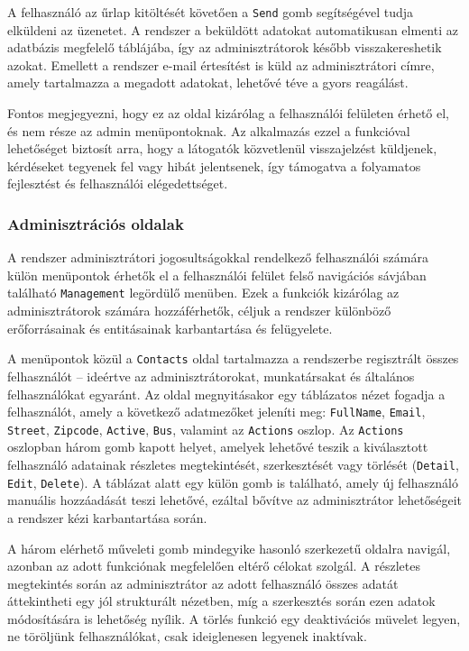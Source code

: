A felhasználó az űrlap kitöltését követően a \texttt{Send} gomb segítségével tudja elküldeni az üzenetet. A rendszer a beküldött adatokat automatikusan elmenti az adatbázis megfelelő táblájába, így az adminisztrátorok később visszakereshetik azokat. Emellett a rendszer e-mail értesítést is küld az adminisztrátori címre, amely tartalmazza a megadott adatokat, lehetővé téve a gyors reagálást.

Fontos megjegyezni, hogy ez az oldal kizárólag a felhasználói felületen érhető el, és nem része az admin menüpontoknak. Az alkalmazás ezzel a funkcióval lehetőséget biztosít arra, hogy a látogatók közvetlenül visszajelzést küldjenek, kérdéseket tegyenek fel vagy hibát jelentsenek, így támogatva a folyamatos fejlesztést és felhasználói elégedettséget.

\subsubsection{Adminisztrációs oldalak}

A rendszer adminisztrátori jogosultságokkal rendelkező felhasználói számára külön menüpontok érhetők el a felhasználói felület felső navigációs sávjában található \texttt{Management} legördülő menüben. Ezek a funkciók kizárólag az adminisztrátorok számára hozzáférhetők, céljuk a rendszer különböző erőforrásainak és entitásainak karbantartása és felügyelete.

A menüpontok közül a \texttt{Contacts} oldal tartalmazza a rendszerbe regisztrált összes felhasználót – ideértve az adminisztrátorokat, munkatársakat és általános felhasználókat egyaránt. Az oldal megnyitásakor egy táblázatos nézet fogadja a felhasználót, amely a következő adatmezőket jeleníti meg: \texttt{FullName}, \texttt{Email}, \texttt{Street}, \texttt{Zipcode}, \texttt{Active}, \texttt{Bus}, valamint az \texttt{Actions} oszlop. Az \texttt{Actions} oszlopban három gomb kapott helyet, amelyek lehetővé teszik a kiválasztott felhasználó adatainak részletes megtekintését, szerkesztését vagy törlését (\texttt{Detail}, \texttt{Edit}, \texttt{Delete}). A táblázat alatt egy külön gomb is található, amely új felhasználó manuális hozzáadását teszi lehetővé, ezáltal bővítve az adminisztrátor lehetőségeit a rendszer kézi karbantartása során.

A három elérhető műveleti gomb mindegyike hasonló szerkezetű oldalra navigál, azonban az adott funkciónak megfelelően eltérő célokat szolgál. A részletes megtekintés során az adminisztrátor az adott felhasználó összes adatát áttekintheti egy jól strukturált nézetben, míg a szerkesztés során ezen adatok módosítására is lehetőség nyílik. A törlés funkció egy deaktivációs müvelet legyen, ne töröljünk felhasználókat, csak ideiglenesen legyenek inaktívak.

